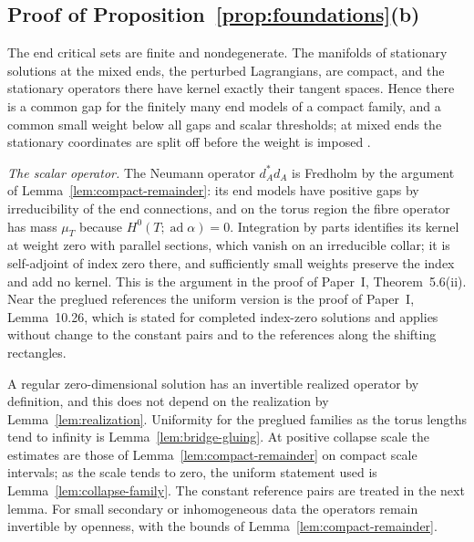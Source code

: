 \documentclass[11pt]{amsart}
\theoremstyle{definition}
\theoremstyle{remark}
\theoremstyle{plain}
\numberwithin{equation}{section}
\newcommand{\ad}{\operatorname{ad}}
\begin{document}
\subsection{Proof of Proposition~\ref{prop:foundations}(b)}
The end critical sets are finite and nondegenerate. The manifolds of
stationary solutions at the mixed ends, the perturbed Lagrangians, are
compact, and the stationary operators there have kernel exactly their
tangent spaces. Hence there is a common gap
for the finitely many end models of a compact family, and a common
small weight below all gaps and scalar thresholds; at mixed ends the
stationary coordinates are split off before the weight is imposed
\cite[Definition~3.9(ii) and Section~4.2.1]{DFL}.

\emph{The scalar operator.} The Neumann operator $d_A^*d_A$ is Fredholm by
the argument of Lemma~\ref{lem:compact-remainder}: its end models have
positive gaps by irreducibility of the end connections, and on the
torus region the fibre operator has mass $\mu_T$ because
$H^0(T;\ad\alpha)=0$. Integration by parts identifies its kernel at
weight zero with parallel sections, which vanish on an irreducible
collar; it is self-adjoint of index zero there, and sufficiently small
weights preserve the index and add no kernel. This is the argument in
the proof of Paper~I, Theorem~5.6(ii). Near the preglued references the
uniform version is the proof of Paper~I, Lemma~10.26, which is stated for
completed index-zero solutions and applies without change to the
constant pairs and to the references along the shifting rectangles.

A regular zero-dimensional solution has an invertible realized operator
by definition, and this does not depend on the realization by
Lemma~\ref{lem:realization}. Uniformity for the preglued families as the
torus lengths tend to infinity is Lemma~\ref{lem:bridge-gluing}. At
positive collapse scale the estimates are those of
Lemma~\ref{lem:compact-remainder} on compact scale intervals; as the
scale tends to zero, the uniform statement used is
Lemma~\ref{lem:collapse-family}. The constant reference pairs are
treated in the next lemma. For small secondary or inhomogeneous data the
operators remain invertible by openness, with the bounds of
Lemma~\ref{lem:compact-remainder}.
\end{document}

